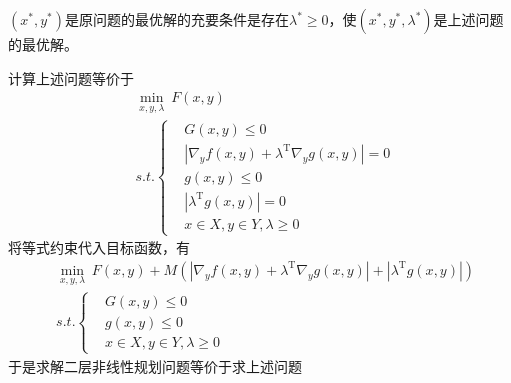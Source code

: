         \begin{theorem}
        $(x^*,y^*)$是原问题的最优解的充要条件是存在${\lambda}^*\geqslant 0$，使$(x^*,y^*,{\lambda}^*)$是上述问题的最优解。
        \end{theorem}
        \par
        计算上述问题等价于
            \begin{align*}
            &\mathop{\min}\limits_{x,y,\lambda}\  F(x,y)\\
            &s.t.\left\{
            \begin{aligned}
            & G(x,y)\leqslant 0\\
            & \left|{\nabla}_y f(x,y)+{\lambda}^\mathrm{T} {\nabla}_yg(x,y)\right|=0\\
            & g(x,y)\leqslant 0\\
            & \left|{\lambda}^\mathrm{T} g(x,y)\right| = 0\\
            & x\in X,y\in Y,{\lambda}\geqslant 0
            \end{aligned}
            \right.
        \end{align*}
        将等式约束代入目标函数，有
            \begin{align*}
            &\mathop{\min}\limits_{x,y,\lambda}\  F(x,y)+M(\left|{\nabla}_y f(x,y)+{\lambda}^\mathrm{T} {\nabla}_yg(x,y)\right|+|{\lambda}^\mathrm{T} g(x,y)|)\\
            &s.t.\left\{
            \begin{aligned}
            & G(x,y)\leqslant 0\\
            & g(x,y)\leqslant 0\\
            & x\in X,y\in Y,{\lambda}\geqslant 0
            \end{aligned}
                \right.
        \end{align*}
        于是求解二层非线性规划问题等价于求上述问题

